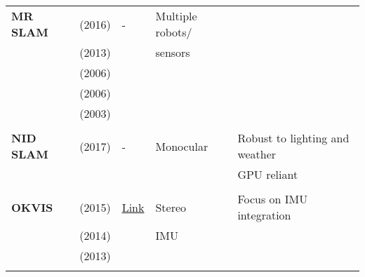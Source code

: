 \documentclass[a4paper,12pt]{scrartcl}
\begin{document}
{\begin{longtable}{l|l|l|l|l}
    \textbf{MR SLAM}       & \cite{Choudhary2016} (2016)       & -                                                                  & Multiple robots/      &\\
                           & \cite{Alexandre2013} (2013)       &                                                                    & sensors               &\\
                           & \cite{Zhou2006} (2006)            &                                                                    &                       &\\
                           & \cite{Howard2006} (2006)          &                                                                    &                       &\\
                           & \cite{Liu2003} (2003)             &                                                                    &                       &\\
                           &                                   &                                                                    &                       &\\
    \textbf{NID SLAM}      & \cite{Pascoe2017} (2017)          & -                                                                  & Monocular             & Robust to lighting and weather\\
                           &                                   &                                                                    &                       & GPU reliant\\
                           &                                   &                                                                    &                       &\\
    \textbf{OKVIS}         & \cite{Leutenegger2015} (2015)     & {\href{https://github.com/ethz-asl/okvis_ros}{Link}}               & Stereo                & Focus on IMU integration\\
                           & \cite{Leutenegger2014} (2014)     &                                                                    & IMU                   &\\
                           & \cite{Leutenegger2013} (2013)     &                                                                    &                       &\\
                           &                                   &                                                                    &                       &\\

\end{longtable}}
\end{document}
